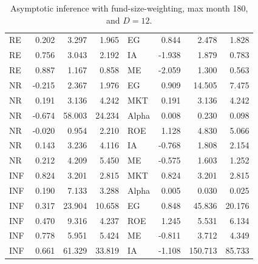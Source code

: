 \documentclass[12pt]{article}
\begin{document}
\begin{table}[ht]
\begin{tabular}{lrrrlrrr}
RE & 0.202 & 3.297 & 1.965 & EG & 0.844 & 2.478 & 1.828 \\ 
RE & 0.756 & 3.043 & 2.192 & IA & -1.938 & 1.879 & 0.783 \\ 
RE & 0.887 & 1.167 & 0.858 & ME & -2.059 & 1.300 & 0.563 \\ 
\hline
NR & -0.215 & 2.367 & 1.976 & EG & 0.909 & 14.505 & 7.475 \\ 
NR & 0.191 & 3.136 & 4.242 & MKT & 0.191 & 3.136 & 4.242 \\ 
NR & -0.674 & 58.003 & 24.234 & Alpha & 0.008 & 0.230 & 0.098 \\ 
NR & -0.020 & 0.954 & 2.210 & ROE & 1.128 & 4.830 & 5.066 \\ 
NR & 0.143 & 3.236 & 4.116 & IA & -0.768 & 1.808 & 2.154 \\ 
NR & 0.212 & 4.209 & 5.450 & ME & -0.575 & 1.603 & 1.252 \\ 
\hline
INF & 0.824 & 3.201 & 2.815 & MKT & 0.824 & 3.201 & 2.815 \\ 
INF & 0.190 & 7.133 & 3.288 & Alpha & 0.005 & 0.030 & 0.025 \\ 
INF & 0.317 & 23.904 & 10.658 & EG & 0.848 & 45.836 & 20.176 \\ 
INF & 0.470 & 9.316 & 4.237 & ROE & 1.245 & 5.531 & 6.134 \\ 
INF & 0.778 & 5.951 & 5.424 & ME & -0.811 & 3.712 & 4.349 \\ 
INF & 0.661 & 61.329 & 33.819 & IA & -1.108 & 150.713 & 85.733 \\ 
		\hline
		\hline
	\end{tabular}
	\caption{Asymptotic inference with fund-size-weighting, max month 180, and $D=12$.} 
	\label{tab:ai_180_FW_VYP_SL}
\end{table}
\end{document}
